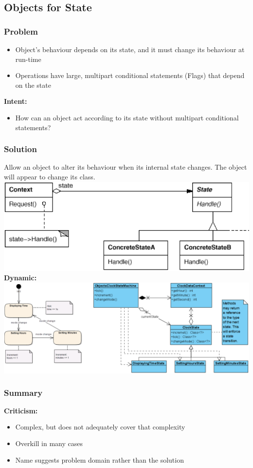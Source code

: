 \subsection{Objects for State}
\subsubsection{Problem}
\begin{itemize}
    \item Object's behaviour depends on its state, and it must change its behaviour at run-time
    \item Operations have large, multipart conditional statements (Flags) that depend on the state
\end{itemize}
\textbf{Intent:}
\begin{itemize}
    \item How can an object act according to its state without multipart conditional statements?
\end{itemize}
\subsubsection{Solution}
Allow an object to alter its behaviour when its internal state changes. The object will appear to change its class.\\ 
\includegraphics[width=\linewidth]{./img/objects_for_state.png}
\textbf{Dynamic:}\\
\includegraphics[width=\linewidth]{./img/objects_for_state_dynamic.png}
\subsubsection{Summary}
\textbf{Criticism:}
\begin{itemize}
    \item Complex, but does not adequately cover that complexity
    \item Overkill in many cases
    \item Name suggests problem domain rather than the solution
\end{itemize}

